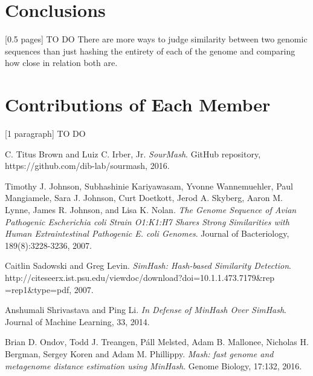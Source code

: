 \documentclass[12pt, letterpaper]{article}
\begin{document}
\section{Conclusions}
[0.5 pages] \color{red} TO DO \color{black} There are more ways to judge similarity between two genomic sequences than just hashing the entirety of each of the genome and comparing how close in relation both are.

\section{Contributions of Each Member}
[1 paragraph] \color{red} TO DO \color{black}

\begin{thebibliography}{9}

  C. Titus Brown and Luiz C. Irber, Jr.
  \textit{SourMash}.
  GitHub repository, https://github.com/dib-lab/sourmash, 2016.
  
  Timothy J. Johnson, Subhashinie Kariyawasam, Yvonne Wannemuehler, Paul Mangiamele, Sara J. Johnson, Curt Doetkott, Jerod A. Skyberg, Aaron M. Lynne, James R. Johnson, and Lisa K. Nolan.
  \textit{The Genome Sequence of Avian Pathogenic Escherichia coli Strain O1:K1:H7 Shares Strong Similarities with Human Extraintestinal Pathogenic E. coli Genomes}.
  Journal of Bacteriology, 189(8):3228-3236, 2007.
  
  Caitlin Sadowski and Greg Levin.
  \textit{SimHash: Hash-based Similarity Detection}.
  http://citeseerx.ist.psu.edu/viewdoc/download?doi=10.1.1.473.7179\&rep\\=rep1\&type=pdf, 
  2007.

  Anshumali Shrivastava and Ping Li.
  \textit{In Defense of MinHash Over SimHash}.
  Journal of Machine Learning, 33, 2014.

  Brian D. Ondov, Todd J. Treangen, Páll Melsted, Adam B. Mallonee, Nicholas H. Bergman, Sergey Koren and Adam M. Phillippy.
  \textit{Mash: fast genome and metagenome distance estimation using MinHash}.
  Genome Biology, 17:132, 2016.

\end{thebibliography}
\end{document}
